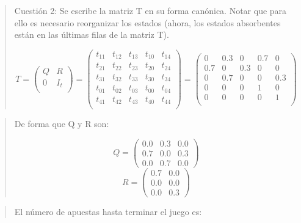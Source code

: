 \documentclass[
  a4paper,
  DIV=11,
  numbers=noendperiod]{scrreprt}
\begin{document}
\begin{quote}
Cuestión 2: Se escribe la matriz T en su forma canónica. Notar que para
ello es necesario reorganizar los estados (ahora, los estados
absorbentes están en las últimas filas de la matriz T).

\[
T =
\begin{pmatrix}
Q & R \\
0 & I_t \\
\end{pmatrix}
= \begin{pmatrix}
t_{11} & t_{12} & t_{13} & t_{10} & t_{14} \\
t_{21} & t_{22} & t_{23} & t_{20} & t_{24} \\
t_{31} & t_{32} & t_{33} & t_{30} & t_{34} \\
t_{01} & t_{02} & t_{03} & t_{00} & t_{04} \\
t_{41} & t_{42} & t_{43} & t_{40} & t_{44} \\
\end{pmatrix} = \begin{pmatrix}
0 & 0.3 & 0 & 0.7 & 0 \\
0.7 & 0 & 0.3 & 0 & 0 \\
0 & 0.7 & 0 & 0 & 0.3 \\
0 & 0 & 0 & 1 & 0 \\
0 & 0 & 0 & 0 & 1 \\
\end{pmatrix}
\]
\end{quote}

\begin{quote}
De forma que Q y R son:

\[ Q = \begin{pmatrix} 0.0 & 0.3 & 0.0 \\ 0.7 & 0.0 & 0.3 \\ 0.0 & 0.7 & 0.0 \end{pmatrix}  \]
\[ R = \begin{pmatrix} 0.7 & 0.0 \\ 0.0 & 0.0 \\ 0.0 & 0.3 \end{pmatrix} \]
\end{quote}

\begin{quote}
El número de apuestas hasta terminar el juego es:
\end{quote}
\end{document}
